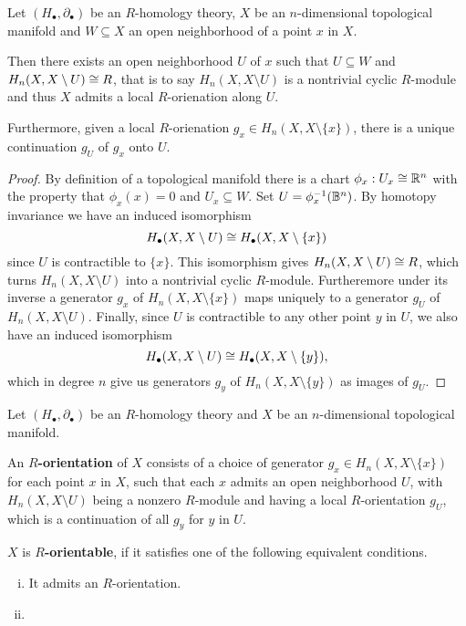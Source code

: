 	\begin{lemma}
		Let $(H_\bullet, \partial_\bullet)$ be an $R$-homology theory, $X$ be an $n$-dimensional topological manifold and $W \subseteq X$ an open neighborhood of a point $x$ in $X$.

		Then there exists an open neighborhood $U$ of $x$ such that $U \subseteq W$ and $H_n(X,X\setminus U) \cong R$, that is to say $H_n(X,X\setminus U)$ is a nontrivial cyclic $R$-module and thus $X$ admits a local $R$-orienation along $U$.

		Furthermore, given a local $R$-orienation $g_x \in H_n(X,X\setminus\{x\})$, there is a unique continuation $g_U$ of $g_x$ onto $U$.
	\end{lemma}
	\begin{proof}
		By definition of a topological manifold there is a chart $\phi_x: U_x \cong \mathbb{R}^n$ with the property that $\phi_x(x)=0$ and $U_x \subseteq W$. Set $U = \phi_x^{-1}(\mathbb{B}^n)$. By homotopy invariance we have an induced isomorphism
		\begin{equation*}
			H_\bullet(X,X\setminus U) \cong H_\bullet(X,X\setminus\{x\})
		\end{equation*}
		since $U$ is contractible to $\{x\}$. This isomorphism gives $H_n(X,X\setminus U) \cong R$, which turns $H_n(X,X\setminus U)$ into a nontrivial cyclic $R$-module. Furtheremore under its inverse a generator $g_x$ of $H_n(X,X\setminus\{x\})$ maps uniquely to a generator $g_U$ of $H_n(X,X\setminus U)$. Finally, since $U$ is contractible to any other point $y$ in $U$, we also have an induced isomorphism
		\begin{equation*}
			H_\bullet(X,X\setminus U) \cong H_\bullet(X,X\setminus \{y\}),
		\end{equation*}
		which in degree $n$ give us generators $g_y$ of $H_n(X,X\setminus \{y\})$ as images of $g_U$.
	\end{proof}

	\begin{definition}
		Let $(H_\bullet, \partial_\bullet)$ be an $R$-homology theory and $X$ be an $n$-dimensional topological manifold.

		An \textbf{$R$-orientation} of $X$ consists of a choice of generator $g_x \in H_n(X,X\setminus\{x\})$ for each point $x$ in $X$, such that each $x$ admits an open neighborhood $U$, with $H_n(X,X\setminus U)$ being a nonzero $R$-module and having a local $R$-orientation $g_U$, which is a continuation of all $g_y$ for $y$ in $U$.

		$X$ is \textbf{$R$-orientable}, if it satisfies one of the following equivalent conditions.
		\begin{enumerate}[(i)]
			\item{
				It admits an $R$-orientation.
			}
			\item{
			}
		\end{enumerate}
	\end{definition}

